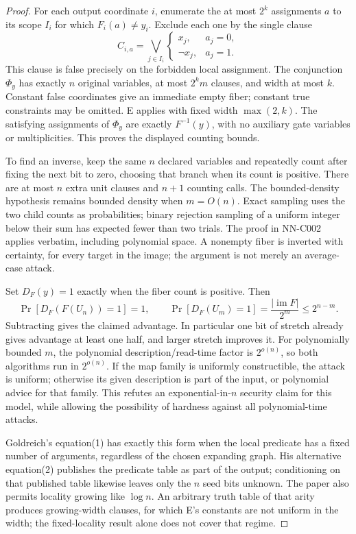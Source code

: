 \begin{proof}
For each output coordinate $i$, enumerate the at most $2^k$ assignments $a$ to its scope $I_i$ for which $F_i(a)\ne y_i$. Exclude each one by the single clause
\[
 C_{i,a}=\bigvee_{j\in I_i}
 \begin{cases}x_j,&a_j=0,\\ \neg x_j,&a_j=1.\end{cases}
\]
This clause is false precisely on the forbidden local assignment. The conjunction $\Phi_y$ has exactly $n$ original variables, at most $2^k m$ clauses, and width at most $k$. Constant false coordinates give an immediate empty fiber; constant true constraints may be omitted. E applies with fixed width $\max(2,k)$. The satisfying assignments of $\Phi_y$ are exactly $F^{-1}(y)$, with no auxiliary gate variables or multiplicities. This proves the displayed counting bounds.

To find an inverse, keep the same $n$ declared variables and repeatedly count after fixing the next bit to zero, choosing that branch when its count is positive. There are at most $n$ extra unit clauses and $n+1$ counting calls. The bounded-density hypothesis remains bounded density when $m=O(n)$. Exact sampling uses the two child counts as probabilities; binary rejection sampling of a uniform integer below their sum has expected fewer than two trials. The proof in NN-C002 applies verbatim, including polynomial space. A nonempty fiber is inverted with certainty, for every target in the image; the argument is not merely an average-case attack.

Set $D_F(y)=1$ exactly when the fiber count is positive. Then
\[
 \Pr[D_F(F(U_n))=1]=1,\qquad
 \Pr[D_F(U_m)=1]=\frac{|\operatorname{im}F|}{2^m}
 \leq2^{n-m}.
\]
Subtracting gives the claimed advantage. In particular one bit of stretch already gives advantage at least one half, and larger stretch improves it. For polynomially bounded $m$, the polynomial description/read-time factor is $2^{o(n)}$, so both algorithms run in $2^{o(n)}$. If the map family is uniformly constructible, the attack is uniform; otherwise its given description is part of the input, or polynomial advice for that family. This refutes an exponential-in-$n$ security claim for this model, while allowing the possibility of hardness against all polynomial-time attacks.

Goldreich's equation(1) has exactly this form when the local predicate has a fixed number of arguments, regardless of the chosen expanding graph. His alternative equation(2) publishes the predicate table as part of the output; conditioning on that published table likewise leaves only the $n$ seed bits unknown. The paper also permits locality growing like $\log n$. An arbitrary truth table of that arity produces growing-width clauses, for which E's constants are not uniform in the width; the fixed-locality result alone does not cover that regime.


\end{proof}
